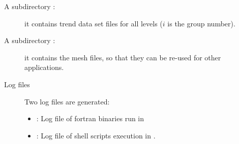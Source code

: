 \begin{description}
\item[A subdirectory :] it contains trend data set files for all levels \linebreak {} ($i$ is the group number).


\item[A subdirectory :] it contains the mesh files, so that they can be re-used for other applications.

\item[Log files] Two log files are generated:
\begin{itemize}
\item  {}: Log file of fortran binaries run in 
\item  {}: Log file of shell scripts execution in .
\end{itemize}

\end{description}
